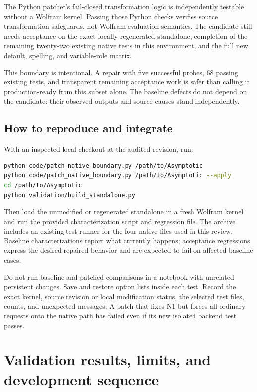 \documentclass[11pt,a4paper]{article}
\newcommand{\code}[1]{\texttt{\detokenize{#1}}}
\begin{document}
The Python patcher's fail-closed transformation logic is independently testable without a Wolfram kernel. Passing those Python checks verifies source transformation safeguards, not Wolfram evaluation semantics. The candidate still needs acceptance on the exact locally regenerated standalone, completion of the remaining twenty-two existing native tests in this environment, and the full new default, spelling, and variable-role matrix.

This boundary is intentional. A repair with five successful probes, 68 passing existing tests, and transparent remaining acceptance work is safer than calling it production-ready from this subset alone. The baseline defects do not depend on the candidate: their observed outputs and source causes stand independently.

\subsection{How to reproduce and integrate}

With an inspected local checkout at the audited revision, run:
\begin{lstlisting}[language=bash]
python code/patch_native_boundary.py /path/to/Asymptotic
python code/patch_native_boundary.py /path/to/Asymptotic --apply
cd /path/to/Asymptotic
python validation/build_standalone.py
\end{lstlisting}
Then load the unmodified or regenerated standalone in a fresh Wolfram kernel and run the provided characterization script and regression file. The archive includes an existing-test runner for the four native files used in this review. Baseline characterizations report what currently happens; acceptance regressions express the desired repaired behavior and are expected to fail on affected baseline cases.

Do not run baseline and patched comparisons in a notebook with unrelated persistent \code{SetOptions} changes. Save and restore option lists inside each test. Record the exact kernel, source revision or local modification status, the selected test files, counts, and unexpected messages. A patch that fixes N1 but forces all ordinary requests onto the native path has failed even if its new isolated backend test passes.

\section{Validation results, limits, and development sequence}
\label{sec:validation}
\end{document}
